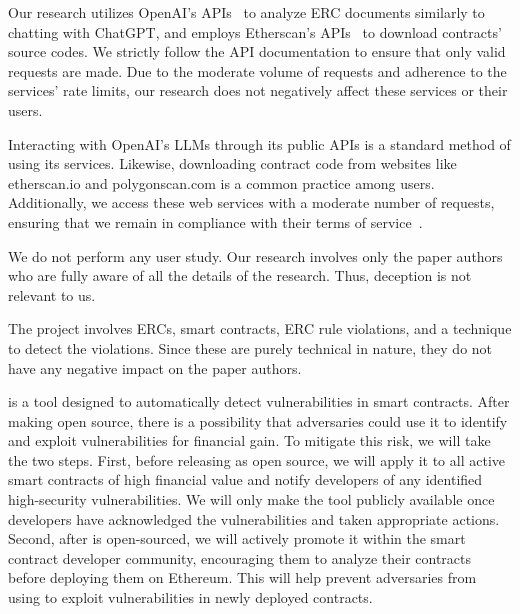 Our research utilizes OpenAI's APIs~\cite{openai-api} to analyze 
ERC documents similarly to chatting with ChatGPT, 
and employs Etherscan's APIs~\cite{etherscan-api} to download contracts’ 
source codes. We strictly follow the API documentation to ensure 
that only valid requests are made. Due to the moderate volume of 
requests and adherence to the services' rate limits, our research does not negatively affect these services or their users.


Interacting with OpenAI's LLMs through its public APIs is a standard method of using its services. 
Likewise, downloading contract code from websites 
like etherscan.io and polygonscan.com is a common practice among users. 
Additionally, we access these web services with a moderate 
number of requests, ensuring that we remain in compliance with their terms of service~\cite{openai-service-terms, etherscan-api-terms, etherscan-terms}.


We do not perform any user study. Our research involves only the paper authors who
are fully aware of all the details of the research. Thus,
deception is not relevant to us. 


The project involves ERCs, smart contracts, ERC rule violations, and a technique to detect the violations. Since these are purely technical in nature, they 
do not have any negative impact on the paper authors.




\Tool{} is a tool designed to automatically 
detect vulnerabilities in smart contracts. 
After making \Tool{} open source, there is a possibility that adversaries could use it to identify and exploit 
vulnerabilities for financial gain. To mitigate this risk, we will take the two steps.
First, before releasing \Tool{} as open source, we will apply it to all active smart contracts of high financial value and notify developers of any identified high-security vulnerabilities. We will only make the tool publicly available once developers have acknowledged the vulnerabilities and taken appropriate actions.
Second, after \Tool{} is open-sourced, we will 
actively promote it within the smart contract 
developer community, encouraging them to analyze 
their contracts before deploying them on Ethereum. 
This will help prevent adversaries from using 
\Tool{} to exploit vulnerabilities in newly 
deployed contracts.



